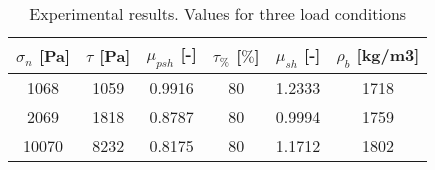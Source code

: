 \begin{table}[h]
\centering
\begin{tabular}{cccccc}
\hline
$\sigma_n$ [Pa] & $\tau$ [Pa] & $\mu_{psh}$ [-] & $\tau_{\%}$ [$\%$] &
$\mu_{sh}$ [-] & $\rho_b$ [kg/m3] \\
\hline
    1068  & 1059  & 0.9916 & 80 & 1.2333 & 1718 \\
    2069  & 1818  & 0.8787 & 80 & 0.9994 & 1759 \\
    10070 & 8232  & 0.8175 & 80 & 1.1712 & 1802 \\

\hline
\end{tabular}
\caption[Experimental results]{Experimental results. Values for three
load conditions}
\label{tab:05sinterTableExperimental}
\end{table}